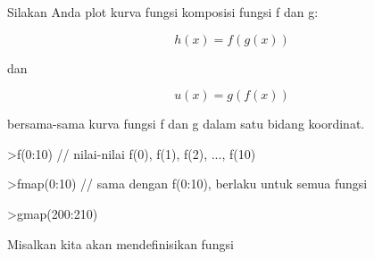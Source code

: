 \documentclass[a4paper,10pt]{article}
\begin{document}
\begin{eulernotebook}
\begin{eulercomment}
\begin{eulercomment}
\begin{eulercomment}
\begin{eulercomment}
\begin{eulercomment}
\begin{eulercomment}
\begin{eulercomment}
\begin{eulercomment}
\begin{eulercomment}
\begin{eulercomment}
\begin{eulercomment}
\begin{eulercomment}
\begin{eulercomment}
\begin{eulercomment}
\begin{eulercomment}
\begin{eulercomment}
\begin{eulercomment}
\begin{eulercomment}
\begin{eulercomment}
\begin{eulercomment}
\begin{eulercomment}
\begin{eulercomment}
\begin{eulercomment}
\begin{eulercomment}
\begin{eulercomment}
Silakan Anda plot kurva fungsi komposisi fungsi f dan g:

\end{eulercomment}
\begin{eulerformula}
\[
h(x)=f(g(x))
\]
\end{eulerformula}
\begin{eulercomment}
dan

\end{eulercomment}
\begin{eulerformula}
\[
u(x)=g(f(x))
\]
\end{eulerformula}
\begin{eulercomment}
bersama-sama kurva fungsi f dan g dalam satu bidang koordinat.
\end{eulercomment}
\begin{eulerprompt}
>f(0:10) // nilai-nilai f(0), f(1), f(2), ..., f(10)
\end{eulerprompt}
\begin{euleroutput}
  [1,  4.31978,  10.4826,  19.1516,  32.4692,  50.3833,  72.7562,
  99.929,  130.69,  163.51,  200.58]
\end{euleroutput}
\begin{eulerprompt}
>fmap(0:10) // sama dengan f(0:10), berlaku untuk semua fungsi
\end{eulerprompt}
\begin{euleroutput}
  [1,  4.31978,  10.4826,  19.1516,  32.4692,  50.3833,  72.7562,
  99.929,  130.69,  163.51,  200.58]
\end{euleroutput}
\begin{eulerprompt}
>gmap(200:210)
\end{eulerprompt}
\begin{euleroutput}
  [0.987534,  0.987596,  0.987657,  0.987718,  0.987778,  0.987837,
  0.987896,  0.987954,  0.988012,  0.988069,  0.988126]
\end{euleroutput}
\begin{eulercomment}
Misalkan kita akan mendefinisikan fungsi


\end{eulercomment}
\end{eulercomment}
\end{eulercomment}
\end{eulercomment}
\end{eulercomment}
\end{eulercomment}
\end{eulercomment}
\end{eulercomment}
\end{eulercomment}
\end{eulercomment}
\end{eulercomment}
\end{eulercomment}
\end{eulercomment}
\end{eulercomment}
\end{eulercomment}
\end{eulercomment}
\end{eulercomment}
\end{eulercomment}
\end{eulercomment}
\end{eulercomment}
\end{eulercomment}
\end{eulercomment}
\end{eulercomment}
\end{eulercomment}
\end{eulercomment}
\end{eulernotebook}
\end{document}
